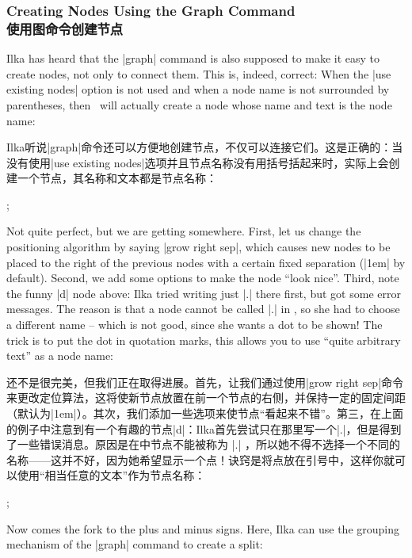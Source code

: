 \subsubsection{Creating Nodes Using the Graph Command\\使用图命令创建节点}

Ilka has heard that the |graph| command is also supposed to make it easy to
create nodes, not only to connect them. This is, indeed, correct: When the
|use existing nodes| option is not used and when a node name is not surrounded
by parentheses, then \tikzname\ will actually create a node whose name and text
is the node name:

Ilka听说|graph|命令还可以方便地创建节点，不仅可以连接它们。这是正确的：当没有使用|use existing nodes|选项并且节点名称没有用括号括起来时，\tikzname 实际上会创建一个节点，其名称和文本都是节点名称：

%
\begin{codeexample}[preamble={\usetikzlibrary{graphs}}]
\tikz {};
\end{codeexample}
%
Not quite perfect, but we are getting somewhere. First, let us change the
positioning algorithm by saying |grow right sep|, which causes new nodes to be
placed to the right of the previous nodes with a certain fixed separation
(|1em| by default). Second, we add some options to make the node ``look nice''.
Third, note the funny |d| node above: Ilka tried writing just |.| there first,
but got some error messages. The reason is that a node cannot be called |.| in
\tikzname, so she had to choose a different name -- which is not good, since
she wants a dot to be shown! The trick is to put the dot in quotation marks,
this allows you to use ``quite arbitrary text'' as a node name:

还不是很完美，但我们正在取得进展。首先，让我们通过使用|grow right sep|命令来更改定位算法，这将使新节点放置在前一个节点的右侧，并保持一定的固定间距（默认为|1em|）。其次，我们添加一些选项来使节点“看起来不错”。第三，在上面的例子中注意到有一个有趣的节点|d|：Ilka首先尝试只在那里写一个|.|，但是得到了一些错误消息。原因是在\tikzname 中节点不能被称为 |.| ，所以她不得不选择一个不同的名称——这并不好，因为她希望显示一个点！诀窍是将点放在引号中，这样你就可以使用“相当任意的文本”作为节点名称：


%
\begin{codeexample}[preamble={\usetikzlibrary{graphs,shapes.misc}}]
\tikz {};
\end{codeexample}
%
Now comes the fork to the plus and minus signs. Here, Ilka can use the grouping
mechanism of the |graph| command to create a split:

